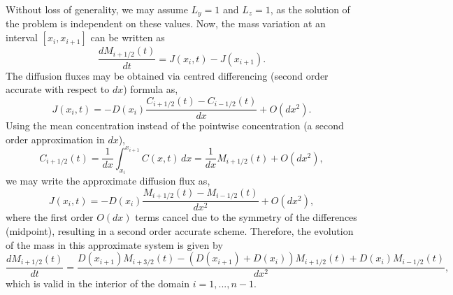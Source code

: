 \documentclass[final,1p,times]{elsarticle}
\begin{document}
Without loss of generality, we may assume $L_y=1$ and $L_z=1$, as the solution of the problem is independent on these values. Now, the mass variation at an interval $[x_i, x_{i+1}]$ can be written as 
\begin{equation}
\frac{d M_{i+1/2}(t)}{dt}= J(x_{i}, t)-J(x_{i+1}).
\end{equation}
The diffusion fluxes may be obtained via centred differencing (second order accurate with respect to $dx$) formula as,
 \begin{equation}
 J(x_{i}, t)=-D(x_i)\frac{C_{i+1/2}(t)-C_{i-1/2}(t)}{dx}+O(dx^2).
 \end{equation}
Using the mean concentration instead of the pointwise concentration (a second order approximation in $dx$),
\begin{equation}
C_{i+1/2}(t)=\frac{1}{dx}\int_{x_i}^{x_{i+1}}C(x,t)\,dx=\frac{1}{dx}M_{i+1/2}(t) + O(dx^2),
\end{equation}
we may write the approximate diffusion flux as,
 \begin{equation}
 J(x_{i}, t)=-D(x_i)\frac{M_{i+1/2}(t)-M_{i-1/2}(t)}{dx^2} + O(dx^2),
 \end{equation}
 where the first order $O(dx)$ terms cancel due to the symmetry of the differences (midpoint), resulting in a second order accurate scheme. 
Therefore, the evolution of the mass in this approximate system is given by
\begin{equation}
\frac{d M_{i+1/2}(t)}{dt}= \frac{D(x_{i+1})M_{i+3/2}(t)-(D(x_{i+1})+D(x_{i}))M_{i+1/2}(t) + D(x_i)M_{i-1/2}(t)}{dx^2},
\end{equation}
which is valid in the interior of the domain $i=1,...,n-1$.
\end{document}
